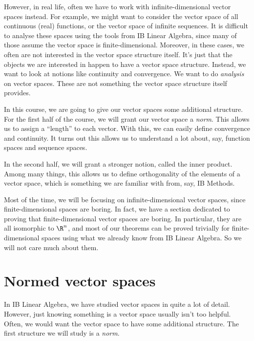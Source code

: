 \documentclass[a4paper]{article}
\begin{document}
However, in real life, often we have to work with infinite-dimensional vector spaces instead. For example, we might want to consider the vector space of all continuous (real) functions, or the vector space of infinite sequences. It is difficult to analyse these spaces using the tools from IB Linear Algebra, since many of those assume the vector space is finite-dimensional. Moreover, in these cases, we often are not interested in the vector space structure itself. It's just that the objects we are interested in happen to have a vector space structure. Instead, we want to look at notions like continuity and convergence. We want to do \emph{analysis} on vector spaces. These are not something the vector space structure itself provides.

In this course, we are going to give our vector spaces some additional structure. For the first half of the course, we will grant our vector space a \emph{norm}. This allows us to assign a ``length'' to each vector. With this, we can easily define convergence and continuity. It turns out this allows us to understand a lot about, say, function spaces and sequence spaces.

In the second half, we will grant a stronger notion, called the inner product. Among many things, this allows us to define orthogonality of the elements of a vector space, which is something we are familiar with from, say, IB Methods.

Most of the time, we will be focusing on infinite-dimensional vector spaces, since finite-dimensional spaces are boring. In fact, we have a section dedicated to proving that finite-dimensional vector spaces are boring. In particular, they are all isomorphic to $\R^n$, and most of our theorems can be proved trivially for finite-dimensional spaces using what we already know from IB Linear Algebra. So we will not care much about them.

\section{Normed vector spaces}
In IB Linear Algebra, we have studied vector spaces in quite a lot of detail. However, just knowing something is a vector space usually isn't too helpful. Often, we would want the vector space to have some additional structure. The first structure we will study is a \emph{norm}.
\end{document}
